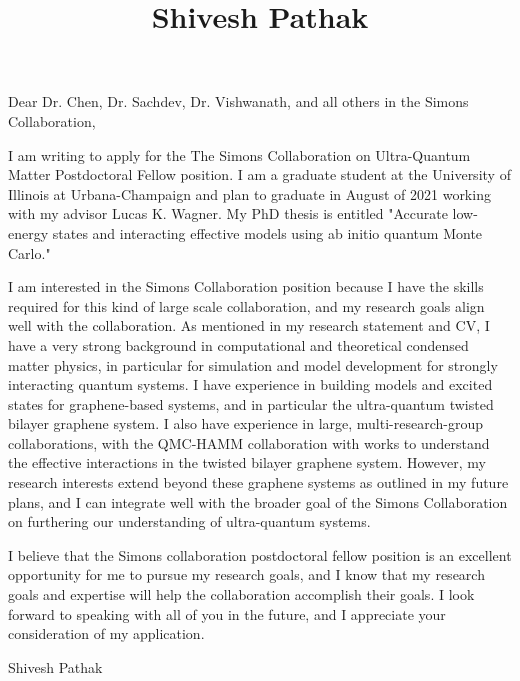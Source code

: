 \documentclass{article}
\title{Shivesh Pathak}
\date{\vspace{-10ex}}
\begin{document}
\maketitle

\noindent Dear Dr. Chen, Dr. Sachdev, Dr. Vishwanath, and all others in the Simons Collaboration, 

I am writing to apply for the The Simons Collaboration on Ultra-Quantum Matter Postdoctoral Fellow position.
I am a graduate student at the University of Illinois at Urbana-Champaign and plan to graduate in August of 2021 working with my advisor Lucas K. Wagner.
My PhD thesis is entitled "Accurate low-energy states and interacting effective models using ab initio quantum Monte Carlo."

I am interested in the Simons Collaboration position because I have the skills required for this kind of large scale collaboration, and my research goals align well with the collaboration.
As mentioned in my research statement and CV, I have a very strong background in computational and theoretical condensed matter physics, in particular for simulation and model development for strongly interacting quantum systems.
I have experience in building models and excited states for graphene-based systems, and in particular the ultra-quantum twisted bilayer graphene system.
I also have experience in large, multi-research-group collaborations, with the QMC-HAMM collaboration with works to understand the effective interactions in the twisted bilayer graphene system.
However, my research interests extend beyond these graphene systems as outlined in my future plans, and I can integrate well with the broader goal of the Simons Collaboration on furthering our understanding of ultra-quantum systems.

I believe that the Simons collaboration postdoctoral fellow position is an excellent opportunity for me to pursue my research goals, and I know that my research goals and expertise will help the collaboration accomplish their goals.
I look forward to speaking with all of you in the future, and I appreciate your consideration of my application.

Shivesh Pathak
\end{document}
